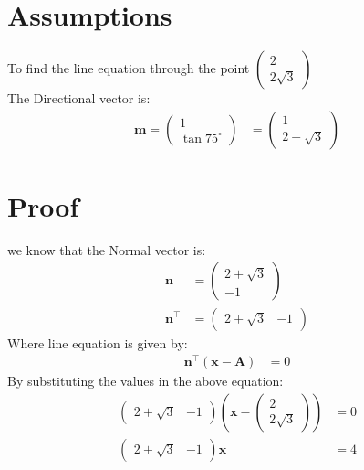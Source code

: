 \documentclass[journal,10pt,twocolumn]{article}
\let\vec\mathbf
\newcommand{\myvec}[1]{\ensuremath{\begin{pmatrix}#1\end{pmatrix}}}
\providecommand{\brak}[1]{\ensuremath{\left(#1\right)}}
\begin{document}
\section{Assumptions}
To find the line equation  through the point $\myvec{2\\2\sqrt{3}}$\\
The Directional vector is:
\begin{align}
	\vec{m}=\myvec{1\\\tan75^\circ}
	&=\myvec{1\\2+\sqrt{3}}
\end{align}
  
\section{Proof}
we know that the Normal vector is:
\begin{align}
	\vec{n}&=\myvec{2+\sqrt{3}\\-1}\\
	\vec{n}^\top&=\myvec{2+\sqrt{3}&-1}	
\end{align}
Where line equation  is given by:
\begin{align}
	\vec{n}^\top \brak{\vec{x}-\vec{A}}&= 0 
\end{align}
By substituting the values in the above equation:
\begin{align}
	\myvec{2+\sqrt{3} &-1}\brak{\vec{x}-\myvec{2\\2\sqrt{3}}}&=0\\
	\myvec{2+\sqrt{3}&-1}\vec{x}&=4
\end{align}
\end{document}
